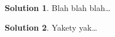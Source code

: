 \documentclass[11pt,leqno,final]{amsart}
\theoremstyle{definition}
\newtheorem{solution}{Solution}
\begin{document}

\begin{solution}
  Blah blah blah\ldots
\end{solution}

\setcounter{solution}{2}        %

\begin{solution}
  Yakety yak\ldots
\end{solution}
\end{document}
